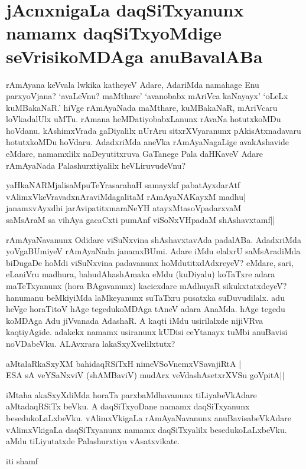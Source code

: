 \section*{jAcnxnigaLa daqSiTxyanunx namamx daqSiTxyoMdige seVrisikoMDAga anuBavalABa}

rAmAyana keVvala lwkika katheyeV Adare, AdariMda namahage Enu parxyoVjana? `avaLeVnu? maMthare' `avanobabx mAriVca kaNayayx' `oLeLx  kuMBakaNaR.' hiVge rAmAyaNada maMthare, kuMBakaNaR, mAriVcaru loVkadalUlx uMTu. rAmana heMDatiyobabxLanunx rAvaNa hotutxkoMDu hoVdanu. kAshimxVrada gaDiyalilx nUrAru sitxrXVyaranunx pAkisAtxnadavaru hotutxkoMDu hoVdaru. AdadxriMda aneVka rAmAyaNagaLige avakAshavide eMdare, namamxlilx naDeyutitxruva GaTanege Pala daHKaveV Adare rAmAyaNada Palashurxtiyalilx heVLiruvudeVnu?

\begin{shloka}
yaHkaNARMjalisaMpuTeYrasarahaH samayxkf pabatAyxdarAtf\label{244a}\\
vAlimxVkeVravadxnAraviMdagalitaM rAmAyaNAKayxM madhu|\\
janamxvAyxdhi jarAvipatitxmaraNeYH atayxMtasoVpadarxvaM\\
saMsAraM sa vihAya gacaCxti pumAnf viSoNxVHpadaM shAshavxtamf||
\end{shloka}

rAmAyaNavanunx Odidare viSuNxvina shAshavxtavAda padalABa. AdadxriMda yoVgaBUmiyeV rAmAyaNada janamxBUmi. Adare iMdu elalxrU saMsAradiMda biDugaDe hoMdi viSuNxvina padavanunx hoMdutitxdAdxreyeV? eMdare, sari, eLaniVru madhura, bahudAhashAmaka eMdu (kuDiyalu) koTaTxre adara maTeTxyanunx (hora BAgavanunx) kacicxdare mAdhuyaR sikukxtatxdeyeV? hanumanu beMkiyiMda laMkeyanunx suTaTxru pusatxka suDuvudilalx. adu heVge horaTitoV hAge tegedukoMDAga tAneV adara AnaMda. hAge tegedu koMDAga Adu jiVvanada AdashaR. A kaqti iMdu usirilalxde nijiVRva kaqtiyAgide. adakekx namamx usiranunx kUDisi ceYtanayx tuMbi anuBavisi noVDabeVku. ALAvxrara lakaSxyXvelilxtutx? 

\begin{shloka}
aMtalaRkaSxyXM bahidaqRSiTxH nimeVSoVnemxVSavajiRtA |\label{244}\\
ESA sA‌ veYSaNxviV (shAMBaviV) mudArx veVdashAsetxrXVSu goVpitA||
\end{shloka}

iMtaha akaSxyXdiMda horaTa parxbaMdhavanunx tiLiyabeVkAdare aMtadaqRSiTx  beVku. A daqSiTxyoDane namamx daqSiTxyanunx besedukoLaLxbeVku. vAlimxVkigaLa rAmAyaNavanunx anuBavisabeVkAdare vAlimxVkigaLa daqSiTxyanunx namamx daqSiTxyalilx besedukoLaLxbeVku. aMdu tiLiyutatxde Palashurxtiya vAsatxvikate.

\begin{center}
iti shamf 
\end{center}
